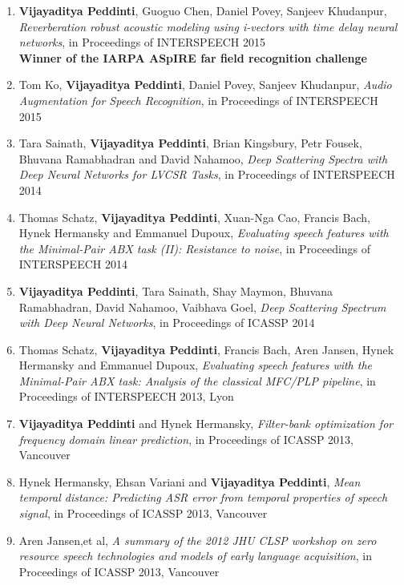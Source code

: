 \documentclass[margin,line,pifont,palatino,courier]{res}
\begin{document}
\begin{resume}
\begin{enumerate}
\item \textbf{Vijayaditya Peddinti}, Guoguo Chen, Daniel Povey, Sanjeev Khudanpur,
\textit{Reverberation robust acoustic modeling using i-vectors with time delay neural networks}, in Proceedings of INTERSPEECH 2015\\
\textbf{Winner of the IARPA ASpIRE far field recognition challenge}

\item Tom Ko, \textbf{Vijayaditya Peddinti}, Daniel Povey, Sanjeev Khudanpur,
\textit{Audio Augmentation for Speech Recognition}, in Proceedings of INTERSPEECH 2015

\item Tara Sainath, \textbf{Vijayaditya Peddinti}, Brian Kingsbury, Petr Fousek, Bhuvana Ramabhadran and David Nahamoo,
\textit{Deep Scattering Spectra with Deep Neural Networks for LVCSR Tasks}, in Proceedings of INTERSPEECH 2014

\item Thomas Schatz, \textbf{Vijayaditya Peddinti}, Xuan-Nga Cao, Francis Bach, Hynek Hermansky and Emmanuel Dupoux,
\textit{Evaluating speech features with the Minimal-Pair ABX task (II): Resistance to noise}, in Proceedings of INTERSPEECH 2014

\item \textbf{Vijayaditya Peddinti}, Tara Sainath, Shay Maymon, Bhuvana Ramabhadran, David Nahamoo, Vaibhava Goel,
\textit{Deep Scattering Spectrum with Deep Neural Networks}, in Proceedings of ICASSP 2014

\item Thomas Schatz, \textbf{Vijayaditya Peddinti}, Francis Bach, Aren Jansen, Hynek Hermansky and Emmanuel Dupoux,
\textit{Evaluating speech features with the Minimal-Pair ABX task: Analysis of the classical MFC/PLP pipeline}, in Proceedings of INTERSPEECH 2013, Lyon

\item \textbf{Vijayaditya Peddinti} and Hynek Hermansky,
\textit{Filter-bank optimization for frequency domain linear prediction}, in Proceedings of ICASSP 2013, Vancouver

\item Hynek Hermansky, Ehsan Variani and \textbf{Vijayaditya Peddinti},
\textit{Mean temporal distance: Predicting ASR error from temporal properties of speech signal}, in Proceedings of ICASSP 2013, Vancouver

\item Aren Jansen,et al, 
\textit{A summary of the 2012 JHU CLSP workshop on zero resource speech technologies and models of early language acquisition}, in Proceedings of ICASSP 2013, Vancouver



\end{enumerate}
\end{resume}
\end{document}
